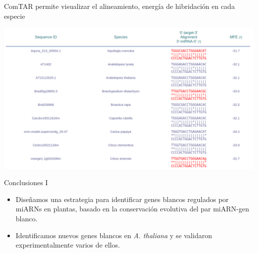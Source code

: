 \documentclass{beamer}
\begin{document}
\begin{frame}{ComTAR permite visualizar el alineamiento, energía de hibridación en cada especie}
	\begin{center}
		\includegraphics[width=1\textwidth]{img/comTAR_fig2.png}
	\end{center}
\end{frame}

\begin{frame}{Conclusiones I}
	\begin{itemize}
        \item<1-> Diseñamos una estrategia para identificar genes blancos regulados por miARNs en plantas, basado en la conservación evolutiva del par miARN-gen blanco.
        \item<2-> Identificamos nuevos genes blancos en \textit{A. thaliana} y se validaron experimentalmente varios de ellos.
	\end{itemize}
\end{frame}
\end{document}
